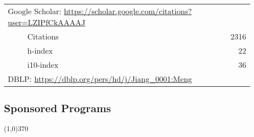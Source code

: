 \documentclass[10pt]{article}
\begin{document}
\begin{table}[h!]
\begin{tabular*}{12.7cm}{p{11.65cm}r}
\multicolumn{2}{l}{Google Scholar: \url{https://scholar.google.com/citations?user=LZIPfCkAAAAJ}} \\
~~~~~Citations&2316 \\
~~~~~h-index&22 \\
~~~~~i10-index&36 \\
\multicolumn{2}{l}{DBLP: \url{https://dblp.org/pers/hd/j/Jiang\_0001:Meng}} \\
\end{tabular*}
\end{table}

\subsection{\sc Sponsored Programs}
\vspace{-0.4cm} \line(1,0){370} \vspace{-0.1cm}
\end{document}
